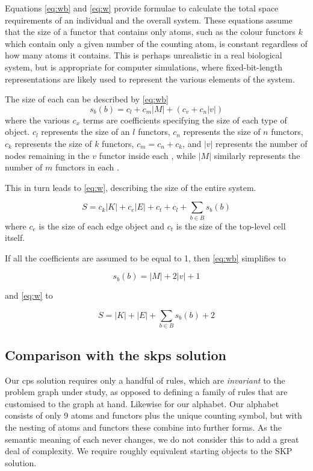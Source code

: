 Equations \eqref{eq:wb} and \eqref{eq:w} provide formulae to calculate the total space requirements of an individual \bo{} and the overall system. These equations assume that the size of a functor that contains only atoms, such as the colour functors \(k\) which contain only a given number of the counting atom, is constant regardless of how many atoms it contains.  This is perhaps unrealistic in a real biological system, but is appropriate for computer simulations, where fixed-bit-length representations are likely used to represent the various elements of the system.

The size of each \bo{} can be described by \eqref{eq:wb}
\begin{equation}\label{eq:wb}
    s_b(b) = c_l + c_m |M| + (c_v + c_n |v|)
\end{equation} where the various \(c_x\) terms are coefficients specifying the size of each type of object.  \(c_l\) represents the size of an \(l\) functors, \(c_n\) represents the size of \(n\) functors, \(c_k\) represents the size of \(k\) functors, \(c_m = c_n + c_k\), and \(|v|\) represents the number of nodes remaining in the \(v\) functor inside each \bo{}, while \(|M|\) similarly represents the number of \(m\) functors in each \bo{}.

This in turn leads to \eqref{eq:w}, describing the size of the entire system.

\begin{equation}\label{eq:w}
    S = c_k |K| + c_e |E| + c_t + c_l + \sum_{b \in B}s_b(b)
\end{equation} where \(c_e\) is the size of each edge object and \(c_t\) is the size of the top-level cell itself.

If all the coefficients are assumed to be equal to 1, then \eqref{eq:wb} simplifies to 

\begin{equation}
    s_b(b) = |M| + 2 |v| + 1
\end{equation}

and \eqref{eq:w} to

\begin{equation}
    S = |K| + |E| + \sum_{b \in B}s_b(b) + 2
\end{equation}

\subsection{Comparison with the \texorpdfstring{\acrlong{skps}}{Simple Kernel P systems} solution}
Our \gls{cps} solution requires only a handful of rules, which are \textit{invariant} to the problem graph under study, as opposed to defining a family of rules that are customised to the graph at hand.  Likewise for our alphabet.  Our alphabet consists of only 9 atoms and functors plus the unique counting symbol, but with the nesting of atoms and functors these combine into further forms.  As the semantic meaning of each never changes, we do not consider this to add a great deal of complexity.  We require roughly equivalent starting objects to the SKP solution.

